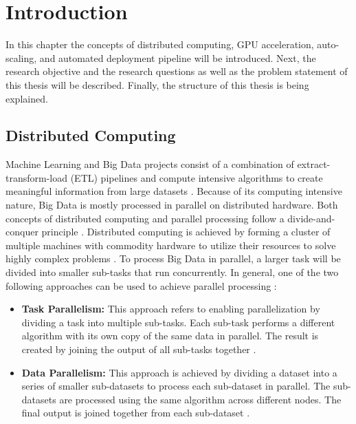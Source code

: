 \chapter{Introduction}
\label{sec:01_introduction}

In this chapter the concepts of distributed computing, GPU acceleration, auto-scaling, and automated deployment pipeline will be introduced.
Next, the research objective and the research questions as well as the problem statement of this thesis will be described.
Finally, the structure of this thesis is being explained.


\section{Distributed Computing}
Machine Learning and Big Data projects consist of a combination of extract-transform-load (ETL) pipelines and compute intensive algorithms to create meaningful information from large datasets \cite{Vadapalli2018DevOps}.
Because of its computing intensive nature, Big Data is mostly processed in parallel on distributed hardware.
Both concepts of distributed computing and parallel processing follow a divide-and-conquer principle \cite{Khattak2016BigData}.
Distributed computing is achieved by forming a cluster of multiple machines with commodity hardware to utilize their resources to solve highly complex problems \cite{Ganelin2016Spark}.
To process Big Data in parallel, a larger task will be divided into smaller sub-tasks that run concurrently.
In general, one of the two following approaches can be used to achieve parallel processing \cite{Khattak2016BigData}:
\begin{itemize}
\item \textbf{Task Parallelism:}
This approach refers to enabling parallelization by dividing a task into multiple sub-tasks.
Each sub-task performs a different algorithm with its own copy of the same data in parallel.
The result is created by joining the output of all sub-tasks together \cite{Khattak2016BigData}.

\item \textbf{Data Parallelism:}
This approach is achieved by dividing a dataset into a series of smaller sub-datasets to process each sub-dataset in parallel.
The sub-datasets are processed using the same algorithm across different nodes.
%
The final output is joined together from each sub-dataset \cite{Khattak2016BigData}.
\end{itemize}
